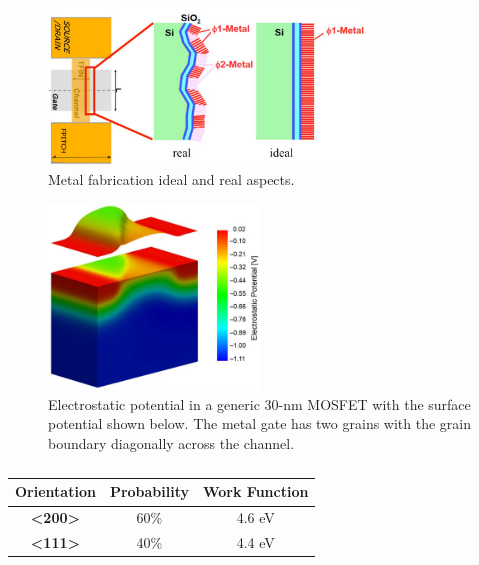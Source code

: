 \documentclass[diss,pgmicro,english]{iiufrgs}
\begin{document}
\begin{figure} []
        \centering
	\includegraphics[width=0.75\textwidth, trim={0 0 0 0},clip]{chrome_2019-05-15_16-55-31.pdf}
        \caption{Metal fabrication ideal and real aspects.}
        \label{fig:meinMetalFab}
\end{figure}

\begin{figure} []
        \centering
        \includegraphics[width=0.5\textwidth, trim={0 0 0 0},clip]{pic-selected-190513-1743-08.pdf}
        \caption{Electrostatic potential in a generic 30-nm MOSFET with the surface potential shown below. The metal gate has two grains with the grain boundary diagonally across the channel.}
        \label{WFFelectros}
\end{figure}

\begin{table}[]
\centering
\caption{}
\label{tab:WFForient}
\begin{tabular}{ccc}
\hline
\textbf{Orientation}                  & \textbf{Probability} & \textbf{Work Function} \\ \hline
\textbf{\textless{}200\textgreater{}} & 60\%                 & 4.6 eV                 \\ \hline
\textbf{\textless{}111\textgreater{}} & 40\%                 & 4.4 eV                 \\ \hline
\end{tabular}
\end{table}
\end{document}
